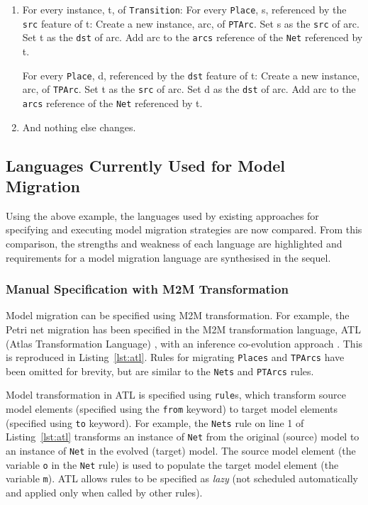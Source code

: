 \begin{enumerate}
	\item For every instance, t, of \texttt{Transition}: 
	\subitem For every \texttt{Place}, s, referenced by the \texttt{src} feature of t: 
	\subsubitem Create a new instance, arc, of \texttt{PTArc}. 
	\subsubitem Set s as the \texttt{src} of arc. 
	\subsubitem Set t as the \texttt{dst} of arc. 
	\subsubitem Add arc to the \texttt{arcs} reference of the \texttt{Net} referenced by t.
	
	\subitem For every \texttt{Place}, d, referenced by the \texttt{dst} feature of t: 
	\subsubitem Create a new instance, arc, of \texttt{TPArc}. 
	\subsubitem Set t as the \texttt{src} of arc. 
	\subsubitem Set d as the \texttt{dst} of arc. 
	\subsubitem Add arc to the \texttt{arcs} reference of the \texttt{Net} referenced by t.
	
	\item And nothing else changes.
\end{enumerate}

\subsection{Languages Currently Used for Model Migration}
\label{subsec:existing_migration_languages}
Using the above example, the languages used by existing approaches for specifying and executing model migration strategies are now compared. From this comparison, the strengths and weakness of each language are highlighted and requirements for a model migration language are synthesised in the sequel.

\subsubsection{Manual Specification with M2M Transformation}
\label{subsubsec:m2m}
Model migration can be specified using M2M transformation. For example, the Petri net migration has been specified in the M2M transformation language, ATL (Atlas Transformation Language) \cite{jouault05transforming}, with an inference co-evolution approach \cite{garces09managing}. This is reproduced in Listing~\ref{lst:atl}. Rules for migrating \texttt{Places} and \texttt{TPArcs} have been omitted for brevity, but are similar to the \texttt{Nets} and \texttt{PTArcs} rules.

Model transformation in ATL is specified using \texttt{rule}s, which transform source model elements (specified using the \texttt{fr\-om} keyword) to target model elements (specified using \texttt{to} keyword). For example, the \texttt{Nets} rule on line 1 of Listing~\ref{lst:atl} transforms an instance of \texttt{Net} from the original (source) model to an instance of \texttt{Net} in the evolved (target) model. The source model element (the variable \texttt{o} in the \texttt{Net} rule) is used to populate the target model element (the variable \texttt{m}). ATL allows rules to be specified as \emph{lazy} (not scheduled automatically and applied only when called by other rules).

